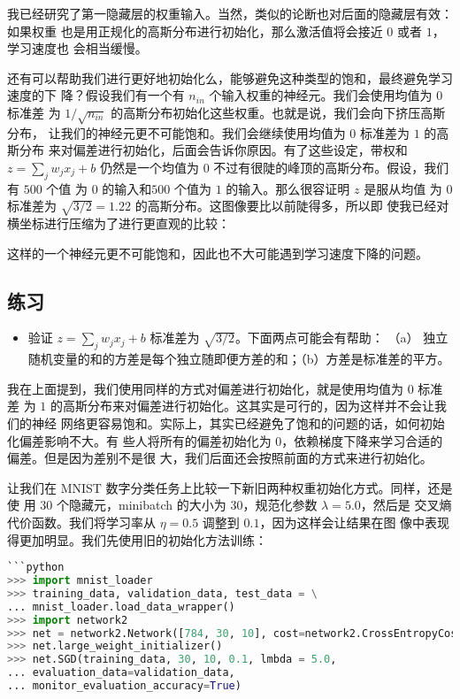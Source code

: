 我已经研究了第一隐藏层的权重输入。当然，类似的论断也对后面的隐藏层有效：如果权重
也是用正规化的高斯分布进行初始化，那么激活值将会接近 $0$ 或者 $1$，学习速度也
会相当缓慢。

还有可以帮助我们进行更好地初始化么，能够避免这种类型的饱和，最终避免学习速度的下
降？假设我们有一个有 $n_{in}$ 个输入权重的神经元。我们会使用均值为 $0$ 标准差
为 $1/\sqrt{n_{in}}$ 的高斯分布初始化这些权重。也就是说，我们会向下挤压高斯分布，
让我们的神经元更不可能饱和。我们会继续使用均值为 $0$ 标准差为 $1$ 的高斯分布
来对偏差进行初始化，后面会告诉你原因。有了这些设定，带权和 $z=\sum_j w_j x_j +
b$ 仍然是一个均值为 $0$ 不过有很陡的峰顶的高斯分布。假设，我们有 $500$ 个值
为 $0$ 的输入和$500$ 个值为 $1$ 的输入。那么很容证明 $z$ 是服从均值
为 $0$ 标准差为 $\sqrt{3/2} = 1.22$ 的高斯分布。这图像要比以前陡得多，所以即
使我已经对横坐标进行压缩为了进行更直观的比较：

这样的一个神经元更不可能饱和，因此也不大可能遇到学习速度下降的问题。

\subsection*{练习}

\begin{itemize}
\item 验证 $z=\sum_j w_j x_j + b$ 标准差为 $\sqrt{3/2}$。下面两点可能会有帮助：
  （a） 独立随机变量的和的方差是每个独立随即便方差的和；（b）方差是标准差的平方。
\end{itemize}

我在上面提到，我们使用同样的方式对偏差进行初始化，就是使用均值为 $0$ 标准差
为 $1$ 的高斯分布来对偏差进行初始化。这其实是可行的，因为这样并不会让我们的神经
网络更容易饱和。实际上，其实已经避免了饱和的问题的话，如何初始化偏差影响不大。有
些人将所有的偏差初始化为 $0$，依赖梯度下降来学习合适的偏差。但是因为差别不是很
大，我们后面还会按照前面的方式来进行初始化。

让我们在 MNIST 数字分类任务上比较一下新旧两种权重初始化方式。同样，还是使
用 $30$ 个隐藏元，minibatch 的大小为 $30$，规范化参数 $\lambda=5.0$，然后是
交叉熵代价函数。我们将学习率从 $\eta=0.5$ 调整到 $0.1$，因为这样会让结果在图
像中表现得更加明显。我们先使用旧的初始化方法训练：

\begin{lstlisting}[language=Python]
```python
>>> import mnist_loader
>>> training_data, validation_data, test_data = \
... mnist_loader.load_data_wrapper()
>>> import network2
>>> net = network2.Network([784, 30, 10], cost=network2.CrossEntropyCost)
>>> net.large_weight_initializer()
>>> net.SGD(training_data, 30, 10, 0.1, lmbda = 5.0,
... evaluation_data=validation_data,
... monitor_evaluation_accuracy=True)
\end{lstlisting}

